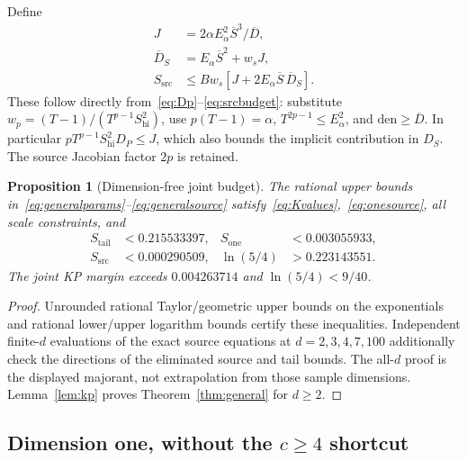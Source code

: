 \documentclass[11pt]{article}
\theoremstyle{plain}
\newtheorem{proposition}{Proposition}
\theoremstyle{remark}
\newcommand{\src}{\mathrm{src}}
\begin{document}
Define
\begin{align}
J&=2\alpha E_\alpha^2\overline S^3/\overline D,\label{eq:J}\\
\overline D_S&=E_\alpha\overline S^2+w_sJ,\label{eq:DbarS}\\
S_{\src}&\le Bw_s[J+2E_\alpha\overline S\,\overline D_S].\label{eq:generalsource}
\end{align}
These follow directly from~\eqref{eq:Dp}--\eqref{eq:srcbudget}: substitute
$w_p=(T-1)/(T^{p-1}S_\mathrm{hi}^2)$, use $p(T-1)=\alpha$,
$T^{2p-1}\le E_\alpha^2$, and $\mathrm{den}\ge\overline D$.
In particular $pT^{p-1}S_\mathrm{hi}^2D_P\le J$, which also bounds the
implicit contribution in $D_S$. The source Jacobian factor $2p$ is retained.

\begin{proposition}[Dimension-free joint budget]\label{prop:generalbudget}
The rational upper bounds in~\eqref{eq:generalparams}--\eqref{eq:generalsource}
satisfy~\eqref{eq:Kvalues},~\eqref{eq:onesource}, all scale constraints, and
\[
\begin{aligned}
S_{\mathrm{tail}}&<0.215533397,&
S_{\mathrm{one}}&<0.003055933,\\
S_{\src}&<0.000290509,&
\ln(5/4)&>0.223143551.
\end{aligned}
\]
The joint KP margin exceeds $0.004263714$ and $\ln(5/4)<9/40$.
\end{proposition}
\begin{proof}
Unrounded rational Taylor/geometric upper bounds on the exponentials and
rational lower/upper logarithm bounds certify these inequalities.
Independent finite-$d$ evaluations of the exact source equations at
$d=2,3,4,7,100$ additionally check the directions of the eliminated source
and tail bounds. The all-$d$ proof is the displayed majorant, not extrapolation
from those sample dimensions. Lemma~\ref{lem:kp} proves
Theorem~\ref{thm:general} for $d\ge2$.
\end{proof}

\subsection{Dimension one, without the \texorpdfstring{$c\ge4$}{c >= 4} shortcut}\label{sec:d1}
\end{document}
